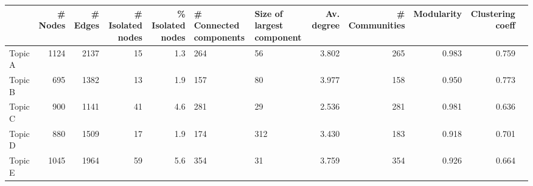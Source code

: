 \begin{tabular}{lrrrrP{0.2\textwidth}P{0.2\textwidth}rrrrr}
\toprule
{} &  \# Nodes &  \# Edges &  \# Isolated nodes &  \% Isolated nodes &  \# Connected components &  Size of largest component &  Av. degree &  \# Communities &  Modularity &  Clustering coeff \\
\midrule
Topic A &     1124 &     2137 &                15 &               1.3 &                     264 &                         56 &       3.802 &            265 &       0.983 &             0.759 \\
Topic B &      695 &     1382 &                13 &               1.9 &                     157 &                         80 &       3.977 &            158 &       0.950 &             0.773 \\
Topic C &      900 &     1141 &                41 &               4.6 &                     281 &                         29 &       2.536 &            281 &       0.981 &             0.636 \\
Topic D &      880 &     1509 &                17 &               1.9 &                     174 &                        312 &       3.430 &            183 &       0.918 &             0.701 \\
Topic E &     1045 &     1964 &                59 &               5.6 &                     354 &                         31 &       3.759 &            354 &       0.926 &             0.664 \\
\bottomrule
\end{tabular}
